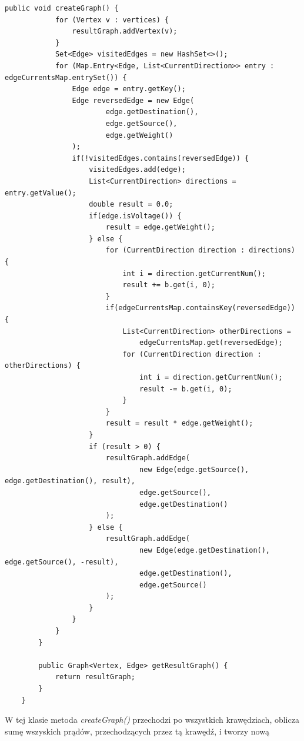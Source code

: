 \documentclass[12pt,a4paper]{article}
\begin{document}
\begin{Verbatim}[fontsize=\small]
        public void createGraph() {
            for (Vertex v : vertices) {
                resultGraph.addVertex(v);
            }
            Set<Edge> visitedEdges = new HashSet<>();
            for (Map.Entry<Edge, List<CurrentDirection>> entry : edgeCurrentsMap.entrySet()) {
                Edge edge = entry.getKey();
                Edge reversedEdge = new Edge(
                        edge.getDestination(),
                        edge.getSource(),
                        edge.getWeight()
                );
                if(!visitedEdges.contains(reversedEdge)) {
                    visitedEdges.add(edge);
                    List<CurrentDirection> directions = entry.getValue();
                    double result = 0.0;
                    if(edge.isVoltage()) {
                        result = edge.getWeight();
                    } else {
                        for (CurrentDirection direction : directions) {
                            int i = direction.getCurrentNum();
                            result += b.get(i, 0);
                        }
                        if(edgeCurrentsMap.containsKey(reversedEdge)) {
                            List<CurrentDirection> otherDirections =
                                edgeCurrentsMap.get(reversedEdge);
                            for (CurrentDirection direction : otherDirections) {
                                int i = direction.getCurrentNum();
                                result -= b.get(i, 0);
                            }
                        }
                        result = result * edge.getWeight();
                    }
                    if (result > 0) {
                        resultGraph.addEdge(
                                new Edge(edge.getSource(), edge.getDestination(), result),
                                edge.getSource(),
                                edge.getDestination()
                        );
                    } else {
                        resultGraph.addEdge(
                                new Edge(edge.getDestination(), edge.getSource(), -result),
                                edge.getDestination(),
                                edge.getSource()
                        );
                    }
                }
            }
        }

        public Graph<Vertex, Edge> getResultGraph() {
            return resultGraph;
        }
    }
\end{Verbatim}
W tej klasie metoda \emph{createGraph()} przechodzi po wszystkich krawędziach,
oblicza sumę wszyskich prądów, przechodzących przez tą krawędź, i tworzy nową
\end{document}
